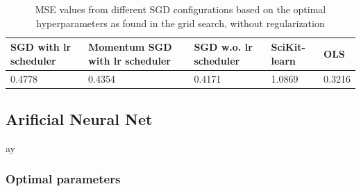 \documentclass
[twocolumn,
secnumarabic,
nobibnotes,
aps,
prl,
reprint,
groupedaddress,
amsmath,
amssymb
]{revtex4-2}
\begin{document}
\begin{table}
  \caption{\label{tab:a_mse_lrlmb}MSE values from different SGD configurations based on the optimal hyperparameters as found in the grid search, without regularization}
  \begin{ruledtabular}
    \begin{tabular}{lllll}
      SGD with lr scheduler & Momentum SGD with lr scheduler & SGD w.o. lr scheduler & SciKit-learn & OLS    \\
      \hline
      0.4778                & 0.4354                         & 0.4171                & 1.0869       & 0.3216 \\
    \end{tabular}
  \end{ruledtabular}
\end{table}

\subsection{Arificial Neural Net}
ay
\subsubsection{Optimal parameters}


\end{document}
